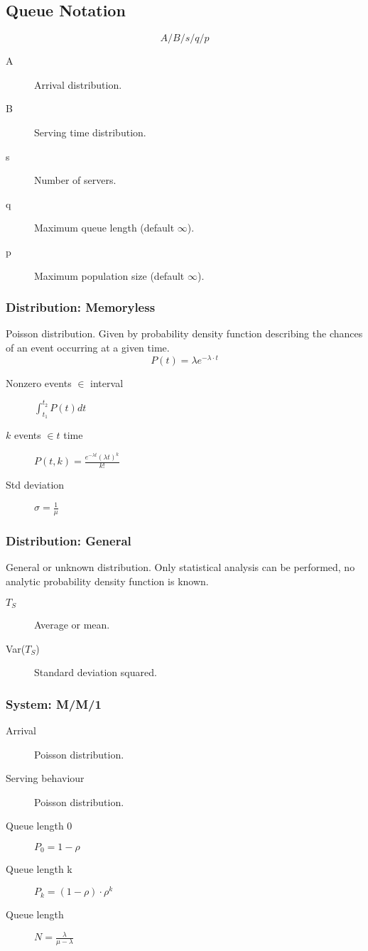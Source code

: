 \documentclass[landscape]{cheat}
\begin{document}
\begin{multicols*}{3}
\subsection{Queue Notation}
\begin{equation*}
    A/B/s/q/p
\end{equation*}
\begin{description}
    \item[A] Arrival distribution.
    \item[B] Serving time distribution.
    \item[s] Number of servers.
    \item[q] Maximum queue length (default $\infty$).
    \item[p] Maximum population size (default $\infty$).
\end{description}

\subsubsection{Distribution: Memoryless}
Poisson distribution. Given by probability density function describing the
chances of an event occurring at a given time.
\begin{equation*}
    P(t) = \lambda e^{-\lambda \cdot t}
\end{equation*}
\begin{description}
    \item[Nonzero events $\in$ interval] $\int_{t_1}^{t_2}P(t)dt$
    \item[$k$ events $\in t$ time] $P(t, k) = \frac {e^{-\lambda t} (\lambda t)^k}{k!}$
    \item[Std deviation] $\sigma = \frac 1 \mu$
\end{description}

\subsubsection{Distribution: General}
General or unknown distribution. Only statistical analysis can be performed, no
analytic probability density function is known.
\begin{description}
    \item[$T_S$] Average or mean.
    \item[Var($T_S$)] Standard deviation squared.
\end{description}

\subsubsection{System: M/M/1}
\begin{description}
    \item[Arrival] Poisson distribution.
    \item[Serving behaviour] Poisson distribution.
    \item[Queue length 0] $P_0 = 1-\rho$
    \item[Queue length k] $P_k = (1-\rho)\cdot \rho^k$
    \item[Queue length] $N = \frac \lambda {\mu - \lambda}$
\end{description}


\end{multicols*}
\end{document}
